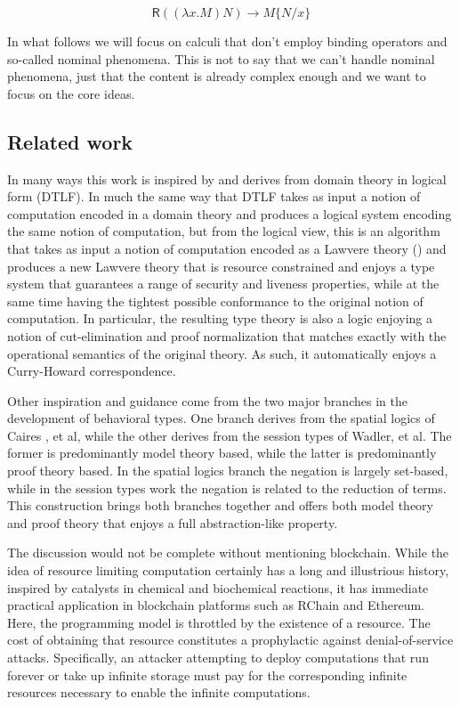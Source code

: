 \documentclass{llncs}
\renewcommand{\:}{\colon}
\begin{document}
\begin{equation*}
  \mathsf{R}((\lambda x.M)N) \rightarrow M\{ N/x \}
\end{equation*}    

In what follows we will focus on calculi that don't employ binding
operators and so-called nominal phenomena. This is not to say that we
can't handle nominal phenomena, just that the content is already
complex enough and we want to focus on the core ideas.


\subsection{Related work}
In many ways this work is inspired by and derives from domain theory
in logical form (DTLF).\cite{DBLP:journals/apal/Abramsky91} In much
the same way that DTLF takes as input a notion of computation encoded
in a domain theory and produces a logical system encoding the same
notion of computation, but from the logical view, this is an algorithm
that takes as input a notion of computation encoded as a Lawvere
theory (\cite{DBLP:journals/entcs/HylandP07}) and produces a new
Lawvere theory that is resource constrained and enjoys a type system
that guarantees a range of security and liveness properties, while at
the same time having the tightest possible conformance to the original
notion of computation. In particular, the resulting type theory is
also a logic enjoying a notion of cut-elimination and proof
normalization that matches exactly with the operational semantics of
the original theory. As such, it automatically enjoys a Curry-Howard
correspondence.

Other inspiration and guidance come from the two major branches in the
development of behavioral types. One branch derives from the spatial
logics of Caires \cite{DBLP:conf/fossacs/Caires04}, et al, while the
other derives from the session types of Wadler, et
al. \cite{DBLP:journals/jfp/Wadler14} The former is predominantly
model theory based, while the latter is predominantly proof theory
based. In the spatial logics branch the negation is largely set-based,
while in the session types work the negation is related to the
reduction of terms. This construction brings both branches together
and offers both model theory and proof theory that enjoys a full
abstraction-like property.

The discussion would not be complete without mentioning
blockchain. While the idea of resource limiting computation certainly
has a long and illustrious history, inspired by catalysts in chemical
and biochemical reactions, it has immediate practical application in
blockchain platforms such as RChain and Ethereum. Here, the
programming model is throttled by the existence of a resource. The
cost of obtaining that resource constitutes a prophylactic against
denial-of-service attacks. Specifically, an attacker attempting to
deploy computations that run forever or take up infinite storage must
pay for the corresponding infinite resources necessary to enable the
infinite computations.
\end{document}
